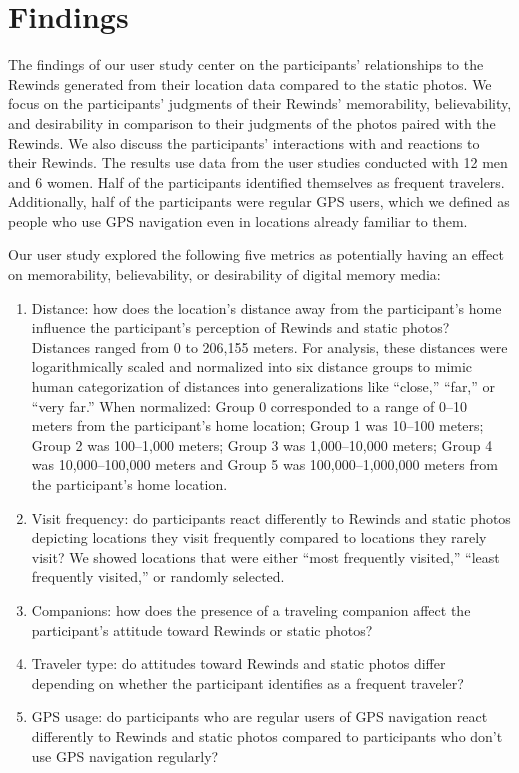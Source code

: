 \documentclass{sigchi}
\begin{document}
\section{Findings}
The findings of our user study center on the participants’ relationships to the Rewinds generated from their location data compared to the static photos. We focus on the participants’ judgments of their Rewinds’ memorability, believability, and desirability in comparison to their judgments of the photos paired with the Rewinds. We also discuss the participants' interactions with and reactions to their Rewinds. The results use data from the user studies conducted with 12 men and 6 women. Half of the participants identified themselves as frequent travelers. Additionally, half of the participants were regular GPS users, which we defined as people who use GPS navigation even in locations already familiar to them.

Our user study explored the following five metrics as potentially having an effect on memorability, believability, or desirability of digital memory media:
\begin{enumerate}
	\item Distance: how does the location's distance away from the participant's home influence the participant's perception of Rewinds and static photos? Distances ranged from 0 to 206,155 meters. For analysis, these distances were logarithmically scaled and normalized into six distance groups to mimic human categorization of distances into generalizations like ``close,'' ``far,'' or ``very far.'' When normalized: Group 0 corresponded to a range of 0--10 meters from the participant's home location; Group 1 was 10--100 meters; Group 2 was 100--1,000 meters; Group 3 was 1,000--10,000 meters; Group 4 was 10,000--100,000 meters and Group 5 was 100,000--1,000,000 meters from the participant's home location.  
	\item Visit frequency: do participants react differently to Rewinds and static photos depicting locations they visit frequently compared to locations they rarely visit? We showed locations that were either ``most frequently visited,'' ``least frequently visited,'' or randomly selected.
	\item Companions: how does the presence of a traveling companion affect the participant's attitude toward Rewinds or static photos?
	\item Traveler type: do attitudes toward Rewinds and static photos differ depending on whether the participant identifies as a frequent traveler?
	\item GPS usage: do participants who are regular users of GPS navigation react differently to Rewinds and static photos compared to participants who don't use GPS navigation regularly?
\end{enumerate}
\end{document}

